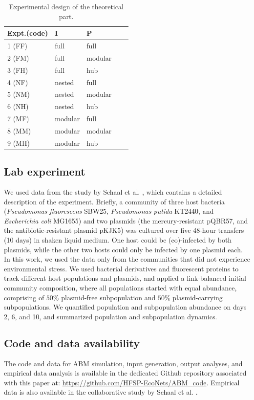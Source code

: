 \documentclass[10pt,letterpaper]{article}
\begin{document}
\begin{table}[ht]
\centering\captionsetup{font=footnotesize}
\begin{center}
 \caption{Experimental design of the theoretical part.}\label{tab: tab4}
 \begin{tabular}{@{}lllll@{}}
 \toprule
Expt.(code) & I  & P \\
 \midrule
    1 (FF) & full & full \\
    2 (FM) & full & modular \\
    3 (FH) & full & hub \\
    4 (NF) & nested & full \\
    5 (NM) & nested & modular \\
    6 (NH) & nested & hub \\
    7 (MF) & modular & full \\
    8 (MM) & modular & modular \\
    9 (MH) & modular & hub \\
 \bottomrule
\end{tabular}
\end{center}
\end{table}

\subsection*{Lab experiment}
\noindent We used data from the study by Schaal et al. \cite{Schaal2025-yu}, which contains a detailed description of the experiment. Briefly, a community of three host bacteria (\textit{Pseudomonas fluorescens} SBW25, \textit{Pseudomonas putida} KT2440, and \textit{Escherichia coli} MG1655) and two plasmids (the mercury-resistant pQBR57, and the antibiotic-resistant plasmid pKJK5) was cultured over five 48-hour transfers (10 days) in shaken liquid medium. One host could be (co)-infected by both plasmids, while the other two hosts could only be infected by one plasmid each. In this work, we used the data only from the communities that did not experience environmental stress. We used bacterial derivatives and fluorescent proteins to track different host populations and plasmids, and applied a link-balanced initial community composition, where all populations started with equal abundance, comprising of $50\%$ plasmid-free subpopulation and $50\%$ plasmid-carrying subpopulations. We quantified population and subpopulation abundance on days 2, 6, and 10, and summarized population and subpopulation dynamics.

\subsection*{Code and data availability}
\noindent The code and data for ABM simulation, input generation, output analyses, and empirical data analysis is available in the dedicated Github repository associated with this paper at: \url{https://github.com/HFSP-EcoNets/ABM_code}. Empirical data is also available in the collaborative study by Schaal et al. \cite{Schaal2025-yu}.
\end{document}

